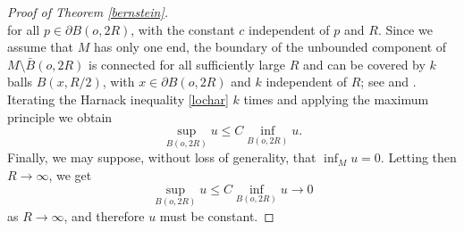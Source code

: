 \documentclass[10pt,a4paper,reqno]{amsart}
\numberwithin{equation}{section}
\theoremstyle{plain}
\theoremstyle{definition}
\begin{document}
\begin{proof}[Proof of Theorem \ref{bernstein}]
\begin{equation}
\end{equation}
for all $p\in\partial B(o,2R)$, with the constant $c$ independent of $p$ and $R$. Since we assume that $M$ has only one end, 
the boundary of the unbounded component of $M\setminus \bar{B}(o,2R)$ is connected for all sufficiently large $R$ and can be covered by $k$ balls $B(x,R/2)$, with $x\in\partial B(o,2R)$ and $k$ independent of $R$; see \cite{Ab} and \cite{kas}.
Iterating the Harnack inequality \eqref{lochar} $k$ times and applying the maximum principle  we obtain
\begin{equation}\label{globhar}
\sup_{B(o,2R)}u\le C\inf_{B(o,2R)}u.
\end{equation}
Finally, we may suppose, without loss of generality, that $\inf_M u=0$. Letting then $R\to\infty$, we get
  \[
\sup_{B(o,2R)}u\le C\inf_{B(o,2R)}u\to 0
\]
  as $R\to\infty$, and therefore $u$ must be constant.
\end{proof}
 
\end{document}
